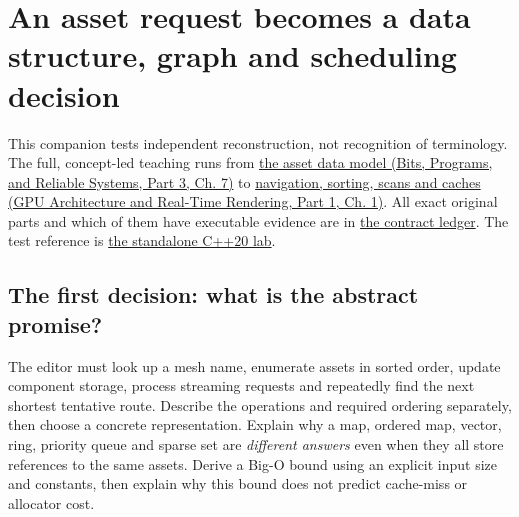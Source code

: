 \hypertarget{appendix-8a046b38375e}{}\label{referencestart:appendix-8a046b38375e}
\section{An asset request becomes a data structure, graph and scheduling decision}\label{appendix-8a046b38375e-an-asset-request-becomes-a-data-structure-graph-and-scheduling-decision}

\hypertarget{appendix-8a046b38375e-an-asset-request-becomes-a-data-structure-graph-and-scheduling-decision}{}

This companion tests independent reconstruction, not recognition of terminology. The full, concept-led teaching runs from \href{../01-Bits-Programs-and-Reliable-Systems-P03/main.pdf\#01-foundations-i-ch007-the-scene-is-now-too-large-for-the-wrong-container-phase-5-m025m027-parts-401445}{the asset data model (Bits, Programs, and Reliable Systems, Part 3, Ch. 7)} to \href{../06-GPU-Architecture-and-Real-Time-Rendering-P01/main.pdf\#01-foundations-i-ch008-from-an-asset-map-to-a-correct-navigable-world-phase-5-m028m030-parts-446500}{navigation, sorting, scans and caches (GPU Architecture and Real-Time Rendering, Part 1, Ch. 1)}. All exact original parts and which of them have executable evidence are in \hyperref[appendix-fd090d982a15-phase-5-algorithms-and-data-structure-workload-contracts-parts-401500]{the contract ledger}. The test reference is \hyperref[source-file-0ec69e1a1a11439bca29faa5]{the standalone C++20 lab}.

\subsection{The first decision: what is the abstract promise?}\label{appendix-8a046b38375e-the-first-decision-what-is-the-abstract-promise}

\hypertarget{appendix-8a046b38375e-the-first-decision-what-is-the-abstract-promise}{}

The editor must look up a mesh name, enumerate assets in sorted order, update component storage, process streaming requests and repeatedly find the next shortest tentative route. Describe the operations and required ordering separately, then choose a concrete representation. Explain why a map, ordered map, vector, ring, priority queue and sparse set are \emph{different answers} even when they all store references to the same assets. Derive a Big-O bound using an explicit input size and constants, then explain why this bound does not predict cache-miss or allocator cost.

